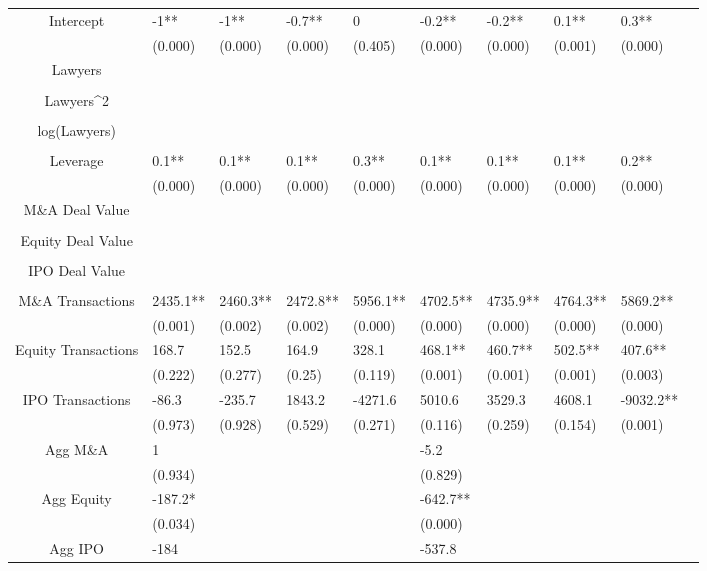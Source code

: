 \documentclass{article}
\begin{document}
\begin{table}[H]
\begin{tabular}{|clllllllll|}
Intercept & -1** & -1** & -0.7** & 0 & -0.2** & -0.2** & 0.1** & 0.3** & \\
   & (0.000) & (0.000) & (0.000) & (0.405) & (0.000) & (0.000) & (0.001) & (0.000) & \\
  Lawyers &  &  &  &  &  &  &  &  & \\
   &  &  &  &  &  &  &  &  & \\
  Lawyers^2 &  &  &  &  &  &  &  &  & \\
   &  &  &  &  &  &  &  &  & \\
  log(Lawyers) &  &  &  &  &  &  &  &  & \\
   &  &  &  &  &  &  &  &  & \\
  Leverage & 0.1** & 0.1** & 0.1** & 0.3** & 0.1** & 0.1** & 0.1** & 0.2** & \\
   & (0.000) & (0.000) & (0.000) & (0.000) & (0.000) & (0.000) & (0.000) & (0.000) & \\
  M\&A Deal Value &  &  &  &  &  &  &  &  & \\
   &  &  &  &  &  &  &  &  & \\
  Equity Deal Value &  &  &  &  &  &  &  &  & \\
   &  &  &  &  &  &  &  &  & \\
  IPO Deal Value &  &  &  &  &  &  &  &  & \\
   &  &  &  &  &  &  &  &  & \\
  M\&A Transactions & 2435.1** & 2460.3** & 2472.8** & 5956.1** & 4702.5** & 4735.9** & 4764.3** & 5869.2** & \\
   & (0.001) & (0.002) & (0.002) & (0.000) & (0.000) & (0.000) & (0.000) & (0.000) & \\
  Equity Transactions & 168.7 & 152.5 & 164.9 & 328.1 & 468.1** & 460.7** & 502.5** & 407.6** & \\
   & (0.222) & (0.277) & (0.25) & (0.119) & (0.001) & (0.001) & (0.001) & (0.003) & \\
  IPO Transactions & -86.3 & -235.7 & 1843.2 & -4271.6 & 5010.6 & 3529.3 & 4608.1 & -9032.2** & \\
   & (0.973) & (0.928) & (0.529) & (0.271) & (0.116) & (0.259) & (0.154) & (0.001) & \\
  Agg M\&A & 1 &  &  &  & -5.2 &  &  &  & \\
   & (0.934) &  &  &  & (0.829) &  &  &  & \\
  Agg Equity & -187.2* &  &  &  & -642.7** &  &  &  & \\
   & (0.034) &  &  &  & (0.000) &  &  &  & \\
  Agg IPO & -184 &  &  &  & -537.8 &  &  &  & \\

\end{tabular}
\end{table}
\end{document}
